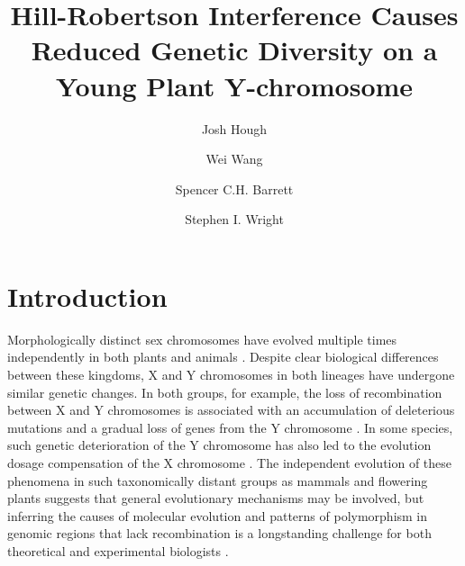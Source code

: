 \documentclass[9pt,twocolumn,twoside]{gsajnl}
\title{Hill-Robertson Interference Causes Reduced Genetic Diversity on a Young Plant Y-chromosome}
\author[$\ast$,$\dagger$,1]{Josh Hough}
\author[$\dagger$]{Wei Wang}
\author[$\dagger$]{Spencer C.H. Barrett}
\author[$\dagger$]{Stephen I. Wright}
\affil[$\ast$]{Department of Plant Sciences, University of California, Davis}
\affil[$\dagger$]{Department of Ecology and Evolutionary Biology, University of Toronto}
\begin{document}
\maketitle
\thispagestyle{firststyle}
\marginmark
\firstpagefootnote
{}
\vspace{-11pt}

\section*{Introduction}

\lettrine[lines=2]{\color{color2}M}{}orphologically distinct sex chromosomes have evolved multiple times independently in both plants and animals \citep{westergaard1958,ohno1967,bull1983,charlesworth1991,charlesworth2015plant}. Despite clear biological differences between these kingdoms, X and Y chromosomes in both lineages have undergone similar genetic changes. In both groups, for example, the loss of recombination between X and Y chromosomes is associated with an accumulation of deleterious mutations and a gradual loss of genes from the Y chromosome \citep{hough2014,bergero2015,bachtrog2013NRG}. In some species, such genetic deterioration of the Y chromosome has also led to the evolution dosage compensation of the X chromosome \citep{charlesworth1996CB,muyle2012,mank2013sex,papadopulos2015}. The independent evolution of these phenomena in such taxonomically distant groups as mammals and flowering plants suggests that general evolutionary mechanisms may be involved, but inferring the causes of molecular evolution and patterns of polymorphism in genomic regions that lack recombination is a longstanding challenge for both theoretical and experimental biologists \citep{charlesworth1978,feldman1980evolution,barton1995general,charlesworth1996CB,otto1997deleterious,charlesworth2000degeneration,mcvean2000effects}.
\end{document}
